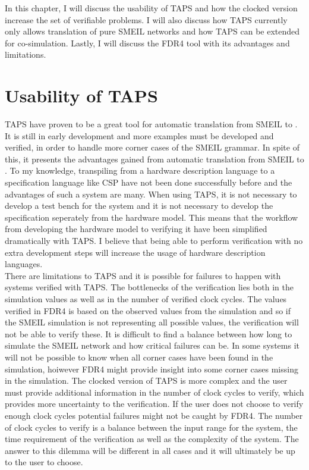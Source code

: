 In this chapter, I will discuss the usability of TAPS and how the clocked version increase the set of verifiable problems. I will also discuss how TAPS currently only allows translation of pure SMEIL networks and how TAPS can be extended for co-simulation. Lastly, I will discuss the FDR4 tool with its advantages and limitations.
\section{Usability of TAPS}
TAPS have proven to be a great tool for automatic translation from SMEIL to \cspm{}. It is still in early development and more examples must be developed and verified, in order to handle more corner cases of the SMEIL grammar. In spite of this, it presents the advantages gained from automatic translation from SMEIL to \cspm{}. To my knowledge, transpiling from a hardware description language to a specification language like CSP have not been done successfully before and the advantages of such a system are many. When using TAPS, it is not necessary to develop a test bench for the system and it is not necessary to develop the specification seperately from the hardware model. This means that the workflow from developing the hardware model to verifying it have been simplified dramatically with TAPS. I believe that being able to perform verification with no extra development steps will increase the usage of hardware description languages. \\

There are limitations to TAPS and it is possible for failures to happen with systems verified with TAPS. The bottlenecks of the verification lies both in the simulation values as well as in the number of verified clock cycles. The values verified in FDR4 is based on the observed values from the simulation and so if the SMEIL simulation is not representing all possible values, the verification will not be able to verify these. It is difficult to find a balance between how long to simulate the SMEIL network and how critical failures can be. In some systems it will not be possible to know when all corner cases have been found in the simulation, hoiwever FDR4 might provide insight into some corner cases missing in the simulation.
The clocked version of TAPS is more complex and the user must provide additional information in the number of clock cycles to verify, which provides more uncertainty to the verification. If the user does not choose to verify enough clock cycles potential failures might not be caught by FDR4. The number of clock cycles to verify is a balance between the input range for the system, the time requirement of the verification as well as the complexity of the system.
The answer to this dilemma will be different in all cases and it will ultimately be up to the user to choose. \\

